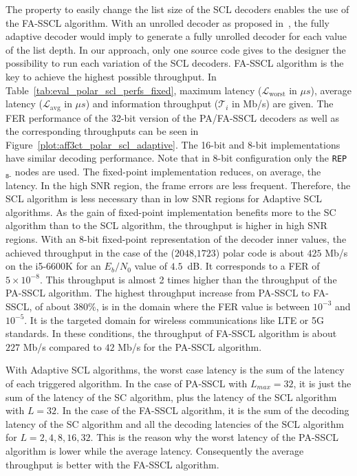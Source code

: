 The property to easily change the list size of the SCL decoders enables the use
of the FA-SSCL algorithm. With an unrolled decoder as proposed
in~\cite{Sarkis2016}, the fully adaptive decoder would imply to generate a fully
unrolled decoder for each value of the list depth. In our approach, only one
source code gives to the designer the possibility to run each variation of the
SCL decoders. FA-SSCL algorithm is the key to achieve the highest possible
throughput. In Table~\ref{tab:eval_polar_scl_perfs_fixed}, maximum latency
($\mathcal{L}_\text{worst}$ in $\mu s$), average latency
($\mathcal{L}_\text{avg}$ in $\mu s$) and information throughput
($\mathcal{T}_i$ in Mb/s) are given. The FER performance of the 32-bit version
of the PA/FA-SSCL decoders as well as the corresponding throughputs can be seen
in Figure~\ref{plot:aff3ct_polar_scl_adaptive}. The 16-bit and 8-bit
implementations have similar decoding performance. Note that in 8-bit
configuration only the \texttt{REP}$_{\texttt{8-}}$ nodes are used. The
fixed-point implementation reduces, on average, the latency. In the high SNR
region, the frame errors are less frequent. Therefore, the SCL algorithm is less
necessary than in low SNR regions for Adaptive SCL algorithms. As the gain of
fixed-point implementation benefits more to the SC algorithm than to the SCL
algorithm, the throughput is higher in high SNR regions. With an 8-bit
fixed-point representation of the decoder inner values, the achieved throughput
in the case of the ($2048$,$1723$) polar code is about $425$ Mb/s on the
i5-6600K for an $E_b/N_0$ value of $4.5$~dB. It corresponds to a FER of
$5\times10^{-8}$. This throughput is almost 2 times higher than the throughput
of the PA-SSCL algorithm. The highest throughput increase from PA-SSCL to
FA-SSCL, of about $380\%$, is in the domain where the FER value is between
$10^{-3}$ and $10^{-5}$. It is the targeted domain for wireless communications
like LTE or 5G standards. In these conditions, the throughput of FA-SSCL
algorithm is about $227$ Mb/s compared to $42$ Mb/s for the PA-SSCL algorithm.

With Adaptive SCL algorithms, the worst case latency is the sum of the latency
of each triggered algorithm. In the case of PA-SSCL with $L_{max}=32$, it is
just the sum of the latency of the SC algorithm, plus the latency of the SCL
algorithm with $L=32$. In the case of the FA-SSCL algorithm, it is the sum of
the decoding latency of the SC algorithm and all the decoding latencies of the
SCL algorithm for $L={2,4,8,16,32}$. This is the reason why the worst latency of
the PA-SSCL algorithm is lower while the average latency. Consequently the
average throughput is better with the FA-SSCL algorithm.

